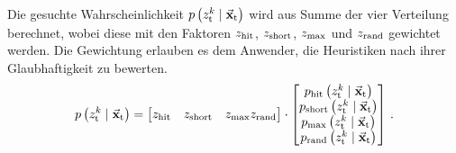 Die gesuchte Wahrscheinlichkeit $p\left({z^k_{\text{t}}} \hspace{1mm} \vert \hspace{1mm} {\vec{\mathbf{x}}_{\text{t}}}\right)$ wird aus Summe der vier Verteilung berechnet, wobei diese mit den Faktoren $z_{\text{hit}}$, $z_{\text{short}}$, $z_{\text{max}}$ und $z_{\text{rand}}$ gewichtet werden. Die Gewichtung erlauben es dem Anwender, die Heuristiken nach ihrer Glaubhaftigkeit zu bewerten.
\begin{equation}
p\left({z^k_{\text{t}}} \hspace{1mm} \vert \hspace{1mm} {\vec{\mathbf{x}}_{\text{t}}}\right) = \begin{bmatrix} z_{\text{hit}} & z_{\text{short}} & z_{\text{max}} z_{\text{rand}} \end{bmatrix} \cdot \begin{bmatrix}
p_{\text{hit}}\left( z^{k}_{\text{t}} \hspace{1mm} \vert \hspace{1mm} \vec{\mathbf{x}}_{\text{t}} \right) \\
p_{\text{short}}\left( z^k_{\text{t}} \hspace{1mm} \vert \hspace{1mm} \vec{\mathbf{x}}_{\text{t}} \right) \\
p_{\text{max}}\left(z^k_{\text{t}} \hspace{1mm} \vert \hspace{1mm} \vec{\mathbf{x}}_{\text{t}}\right) \\
p_{\text{rand}}\left( z^k_{\text{t}} \hspace{1mm} \vert \hspace{1mm} \vec{\mathbf{x}}_{\text{t}}\right)
\end{bmatrix}\,.
\end{equation}